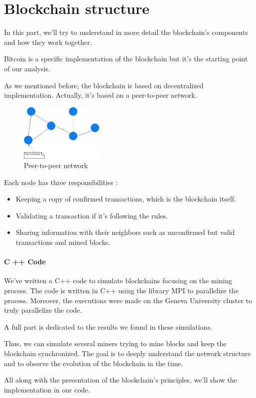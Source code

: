 \section{Blockchain structure}

In this part, we'll try to understand in more detail the blockchain's components and how they work together.

Bitcoin is a specific implementation of the blockchain but it's the starting point of our analysis. \newline

As we mentioned before, the blockchain is based on decentralized implementation. Actually, it's based on a peer-to-peer network.

\begin{figure}[ht]
\centering
\includegraphics[width=4cm]{Figures/network}
\caption{Peer-to-peer network}
\end{figure}
\medskip

Each node has three responsibilities :

\begin{itemize}
  \item Keeping a copy of confirmed transactions, which is the blockchain itself.
  \item Validating a transaction if it's following the rules.
  \item Sharing information with their neighbors such as unconfirmed but valid transactions and mined blocks.
\end{itemize}

\clearpage

\begin{aside}

\paragraph{C ++ Code}

We've written a C++ code to simulate blockchains focusing on the mining process. The code is written in C++ using the library MPI to parallelize the process. Moreover, the executions were made on the Geneva University cluster to truly parallelize the code.

A full part is dedicated to the results we found in these simulations. \newline

Thus, we can simulate several miners trying to mine blocks and keep the blockchain synchronized. The goal is to deeply understand the network structure and to observe the evolution of the blockchain in the time. \newline

All along with the presentation of the blockchain's principles, we'll show the implementation in our code.

\end{aside}
\medskip

